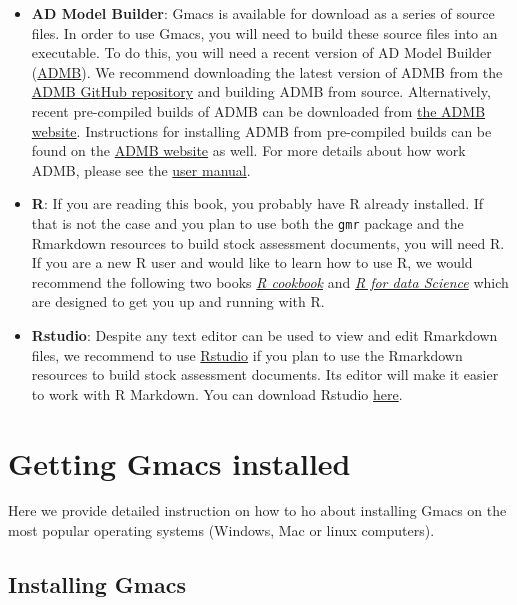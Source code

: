 \documentclass[
]{book}
\begin{document}
\begin{itemize}
\item
  \textbf{AD Model Builder}: Gmacs is available for download as a series of source files. In order to use Gmacs, you will need to build these source files into an executable. To do this, you will need a recent version of AD Model Builder (\href{http://www.admb-project.org/}{ADMB}). We recommend downloading the latest version of ADMB from the \href{https://github.com/admb-project/admb}{ADMB GitHub repository} and building ADMB from source. Alternatively, recent pre-compiled builds of ADMB can be downloaded from \href{http://www.admb-project.org/downloads/}{the ADMB website}. Instructions for installing ADMB from pre-compiled builds can be found on the \href{http://www.admb-project.org/docs/install/}{ADMB website} as well. For more details about how work ADMB, please see the \href{http://www.admb-project.org/docs/manuals/}{user manual}.
\item
  \textbf{R}: If you are reading this book, you probably have R already installed. If that is not the case and you plan to use both the \texttt{gmr} package and the Rmarkdown resources to build stock assessment documents, you will need R. If you are a new R user and would like to learn how to use R, we would recommend the following two books \href{https://rc2e.com/index.html}{\emph{R cookbook}} and \href{https://r4ds.had.co.nz/}{\emph{R for data Science}} which are designed to get you up and running with R.
\item
  \textbf{Rstudio}: Despite any text editor can be used to view and edit Rmarkdown files, we recommend to use \href{https://www.rstudio.com/}{Rstudio} if you plan to use the Rmarkdown resources to build stock assessment documents. Its editor will make it easier to work with R Markdown. You can download Rstudio \href{https://www.rstudio.com/products/rstudio/download/}{here}.
\end{itemize}

\hypertarget{getting-gmacs-installed}{%
\section*{Getting Gmacs installed}\label{getting-gmacs-installed}}

Here we provide detailed instruction on how to ho about installing Gmacs on the most popular operating systems (Windows, Mac or linux computers).

\hypertarget{installing-gmacs}{%
\subsection*{Installing Gmacs}\label{installing-gmacs}}
\end{document}

